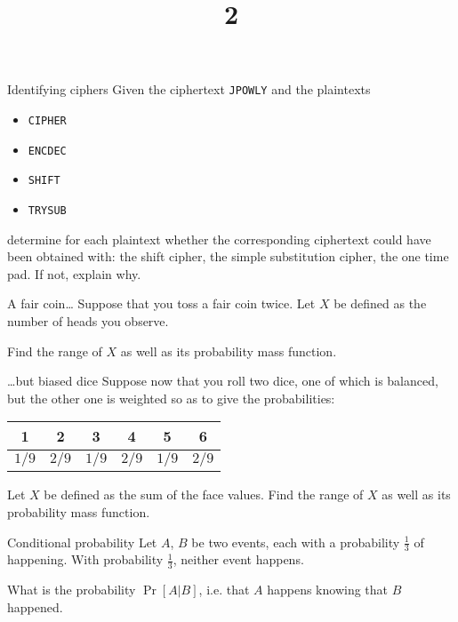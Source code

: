 \documentclass{practice}
\title{2}
\date{\DTMdate{2024-09-18}}
\begin{document}
\maketitle

\begin{task}{Identifying ciphers}
  Given the ciphertext \texttt{JPOWLY} and the plaintexts
  \begin{itemize}
    \item \texttt{CIPHER}
    \item \texttt{ENCDEC}
    \item \texttt{SHIFT}
    \item \texttt{TRYSUB}
  \end{itemize}
  determine for each plaintext whether the corresponding ciphertext could have been obtained with: the shift cipher, the simple substitution cipher, the one time pad.
  If not, explain why.
\end{task}

\begin{task}{A fair coin\dots}
  Suppose that you toss a fair coin twice.
  Let $X$ be defined as the number of heads you observe.

  Find the range of $X$ as well as its probability mass function.
\end{task}

\begin{task}{\dots{}but biased dice}
  Suppose now that you roll two dice, one of which is balanced, but the other one is weighted
  so as to give the probabilities:
  \begin{table}[h!]
    \centering
    \begin{tabular}{@{}cccccc@{}}
      1 & 2 & 3 & 4 & 5 & 6\\\midrule
      $1/9$ & $2/9$ & $1/9$ & $2/9$ & $1/9$ & $2/9$
    \end{tabular}
  \end{table}
  \vspace{-0.7em}

  Let $X$ be defined as the sum of the face values.
  Find the range of $X$ as well as its probability mass function.
\end{task}

\begin{task}{Conditional probability}
  Let $A$, $B$ be two events, each with a probability $\frac{1}{3}$ of happening.
  With probability $\frac{1}{3}$, neither event happens.

  What is the probability $\Pr[A\vert B]$, i.e. that $A$ happens knowing that $B$ happened.
\end{task}
\end{document}
